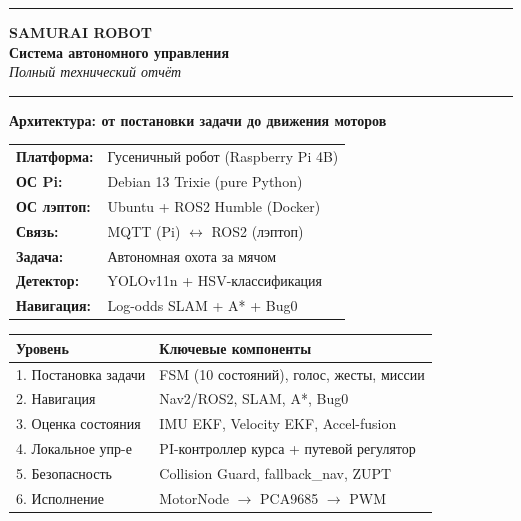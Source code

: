 \documentclass[12pt, a4paper]{article}
\begin{document}

\begin{titlepage}
\begin{center}
\vspace*{1cm}

{\color{primary}\rule{\linewidth}{2pt}}
\vspace{0.5cm}

{\Huge\bfseries\color{primary} SAMURAI ROBOT}\\[0.4cm]
{\LARGE\bfseries Система автономного управления}\\[0.3cm]
{\large\itshape\color{gray} Полный технический отчёт}

\vspace{0.5cm}
{\color{primary}\rule{\linewidth}{2pt}}

\vspace{1.5cm}

\begin{tcolorbox}[
  enhanced, width=0.85\textwidth,
  colback=lightblue, colframe=primary,
  halign=center, valign=center
]
\large
\textbf{Архитектура: от постановки задачи до движения моторов}\\[0.5cm]
\normalsize
\begin{tabular}{ll}
  \textbf{Платформа:}  & Гусеничный робот (Raspberry Pi 4B) \\
  \textbf{ОС Pi:}      & Debian 13 Trixie (pure Python) \\
  \textbf{ОС лэптоп:}  & Ubuntu + ROS2 Humble (Docker) \\
  \textbf{Связь:}      & MQTT (Pi) $\leftrightarrow$ ROS2 (лэптоп) \\
  \textbf{Задача:}     & Автономная охота за мячом \\
  \textbf{Детектор:}   & YOLOv11n + HSV-классификация \\
  \textbf{Навигация:}  & Log-odds SLAM + A* + Bug0 \\
\end{tabular}
\end{tcolorbox}

\vspace{2cm}

\begin{tabular}{|p{3.5cm}|p{8cm}|}
\hline
\rowcolor{primary!20}
\textbf{Уровень} & \textbf{Ключевые компоненты} \\ \hline
1. Постановка задачи   & FSM (10 состояний), голос, жесты, миссии \\ \hline
2. Навигация           & Nav2/ROS2, SLAM, A*, Bug0 \\ \hline
3. Оценка состояния    & IMU EKF, Velocity EKF, Accel-fusion \\ \hline
4. Локальное упр-е     & PI-контроллер курса + путевой регулятор \\ \hline
5. Безопасность        & Collision Guard, fallback\_nav, ZUPT \\ \hline
6. Исполнение          & MotorNode $\to$ PCA9685 $\to$ PWM \\ \hline
\end{tabular}


\end{center}
\end{titlepage}
\end{document}
